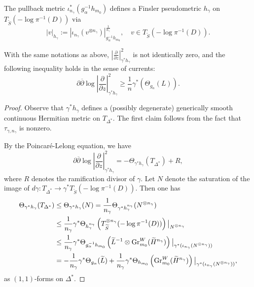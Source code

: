 \documentclass[11pt,letterpaper]{amsart}
\numberwithin{equation}{section}
\begin{document}
	The pullback metric $\iota_{n_\gamma}^\ast(g_\alpha^{-1}h_{m_0})$ defines a Finsler pseudometric $h_\gamma$ on $T_{\widetilde{S}}(-\log \pi^{-1}(D))$ via  
	$$  
	|v|_{h_\gamma} := |\iota_{n_\gamma}(v^{\otimes n_\gamma})|^{\frac{1}{n_\gamma}}_{g_\alpha^{-1}h_{m_0}}, \quad v \in T_{\widetilde{S}}(-\log \pi^{-1}(D)).  
	$$ 
	\begin{prop}\label{prop_negative_curvature}  
		With the same notations as above, $|\frac{\partial}{\partial z}|^2_{\gamma^\ast h_\gamma}$ is not identically zero, and the following inequality holds in the sense of currents:  
		$$  
		\partial\overline{\partial} \log \left| \frac{\partial}{\partial z} \right|^2_{\gamma^\ast h_\gamma} \geq \frac{1}{n} \gamma^\ast (\Theta_{g_\alpha}(L)).  
		$$  
	\end{prop}  	
	\begin{proof}  
		Observe that $\gamma^\ast h_\gamma$ defines a (possibly degenerate) generically smooth continuous Hermitian metric on $T_{\Delta^\ast}$. The first claim follows from the fact that $\tau_{\gamma,n_\gamma}$ is nonzero.  
		
		By the Poincar\'e-Lelong equation, we have  
		$$  
		\partial\overline{\partial} \log \left| \frac{\partial}{\partial z} \right|^2_{\gamma^\ast h_\gamma} = -\Theta_{\gamma^\ast h_\gamma}(T_{\Delta^\ast}) + R,  
		$$  
		where $R$ denotes the ramification divisor of $\gamma$. Let $N$ denote the saturation of the image of $d\gamma: T_{\Delta^\ast} \to \gamma^\ast T_{\widetilde{S}}(-\log \pi^{-1}(D))$. Then one has  
		\begin{align*}  
			\Theta_{\gamma^\ast h_\gamma}(T_{\Delta^\ast}) &\leq \Theta_{\gamma^\ast h_\gamma}(N) = \frac{1}{n_\gamma} \Theta_{\gamma^\ast h_\gamma^{n_\gamma}}(N^{\otimes n_\gamma}) \\  
			&\leq \frac{1}{n_\gamma} \gamma^\ast \Theta_{h_\gamma^{n_\gamma}}\left(T^{\otimes n_\gamma}_{\widetilde{S}}(-\log \pi^{-1}(D))\right)\big|_{N^{\otimes n_\gamma}} \\  
			&\leq \frac{1}{n_\gamma} \gamma^\ast \Theta_{g_\alpha^{-1}h_{m_0}}\left(\widetilde{L}^{-1} \otimes {\rm Gr}^W_{m_0}(\widetilde{H}^{n_\gamma})\right)\big|_{\gamma^\ast(\iota_{n_\gamma}(N^{\otimes n_\gamma}))} \\  
			&= -\frac{1}{n_\gamma} \gamma^\ast \Theta_{g_\alpha}(\widetilde{L}) + \frac{1}{n_\gamma} \gamma^\ast \Theta_{h_{m_0}}\left({\rm Gr}^W_{m_0}(\widetilde{H}^{n_\gamma})\right)\big|_{\gamma^\ast(\iota_{n_\gamma}(N^{\otimes n_\gamma}))},  
		\end{align*}  
		as $(1,1)$-forms on $\Delta^\ast$.  
		

\end{proof}
\end{document}
